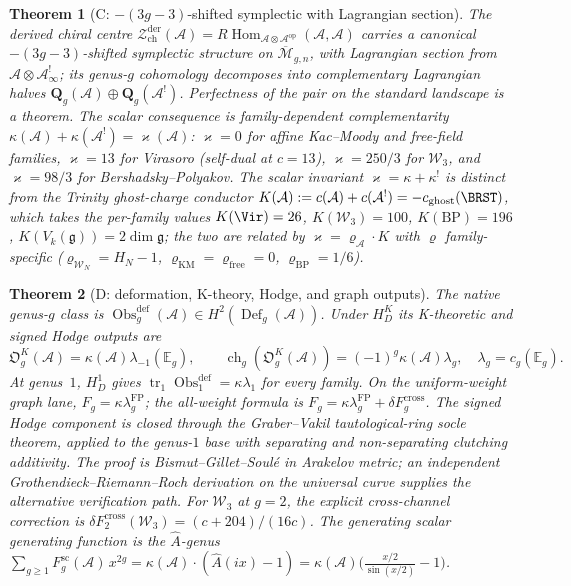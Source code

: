 \documentclass[11pt]{article}
\providecommand{\cA}{\mathcal{A}}
\providecommand{\cM}{\mathcal{M}}
\providecommand{\cW}{\mathcal{W}}
\providecommand{\cZ}{\mathcal{Z}}
\providecommand{\bE}{\mathbb{E}}
\providecommand{\fg}{\mathfrak{g}}
\newtheorem{theorem}{Theorem}[section]
\begin{document}
\begin{theorem}[C: $-(3g{-}3)$-shifted symplectic with Lagrangian section]
The derived chiral centre
$\cZ^{\mathrm{der}}_{\mathrm{ch}}(\cA) =
R\!\operatorname{Hom}_{\cA\otimes\cA^{\mathrm{op}}}(\cA,\cA)$
carries a canonical $-(3g{-}3)$-shifted symplectic structure on
$\overline{\cM}_{g,n}$, with Lagrangian section from
$\cA\otimes\cA^{!}_\infty$; its genus-$g$ cohomology decomposes
into complementary Lagrangian halves
$\mathbf{Q}_g(\cA)\oplus\mathbf{Q}_g(\cA^{!})$. Perfectness of the
pair on the standard landscape is a theorem. The scalar consequence
is family-dependent complementarity $\kappa(\cA)+\kappa(\cA^{!})=\varkappa(\cA)$:
$\varkappa=0$ for affine Kac--Moody and free-field families, $\varkappa=13$ for
Virasoro (self-dual at $c=13$), $\varkappa=250/3$ for $\cW_3$, and
$\varkappa=98/3$ for Bershadsky--Polyakov. The scalar invariant
$\varkappa=\kappa+\kappa^{!}$ is distinct from the Trinity ghost-charge
conductor $K(\cA):=c(\cA)+c(\cA^{!})=-c_{\mathrm{ghost}}(\BRST)$, which takes
the per-family values $K(\Vir)=26$, $K(\cW_3)=100$, $K(\mathrm{BP})=196$,
$K(V_k(\fg))=2\dim\fg$; the two are related by
$\varkappa=\varrho_{\cA}\cdot K$ with $\varrho$ family-specific
($\varrho_{\cW_N}=H_N-1$, $\varrho_{\mathrm{KM}}=\varrho_{\mathrm{free}}=0$,
$\varrho_{\mathrm{BP}}=1/6$).
\end{theorem}

\begin{theorem}[D: deformation, K-theory, Hodge, and graph outputs]
The native genus-$g$ class is
$\operatorname{Obs}^{\mathrm{def}}_g(\cA)
\in H^2(\operatorname{Def}_g(\cA))$.
Under $H_D^K$ its K-theoretic and signed Hodge outputs are
\[
 \mathfrak{O}_g^K(\cA)=\kappa(\cA)\lambda_{-1}(\bE_g),
 \qquad
 \operatorname{ch}_g(\mathfrak{O}_g^K(\cA))
 =(-1)^g\kappa(\cA)\lambda_g,
 \quad \lambda_g=c_g(\bE_g).
\]
At genus~$1$, $H_D^1$ gives
$\operatorname{tr}_1\operatorname{Obs}^{\mathrm{def}}_1
=\kappa\lambda_1$ for every family.  On the uniform-weight graph
lane, $F_g=\kappa\lambda_g^{\mathrm{FP}}$; the all-weight formula is
$F_g=\kappa\lambda_g^{\mathrm{FP}}+\delta F_g^{\mathrm{cross}}$.
The signed Hodge component is closed through the
Graber--Vakil tautological-ring socle theorem, applied to the
genus-$1$ base with separating and non-separating clutching
additivity. The proof is Bismut--Gillet--Soul\'e in
Arakelov metric; an independent Grothendieck--Riemann--Roch
derivation on the universal curve supplies the alternative
verification path. For $\cW_3$ at $g=2$, the explicit
cross-channel correction is
$\delta F_2^{\mathrm{cross}}(\cW_3) = (c+204)/(16c)$. The generating
scalar generating function is the $\hat A$-genus
$\sum_{g\ge 1}F_g^{\mathrm{sc}}(\cA)\,x^{2g}
= \kappa(\cA)\cdot(\hat A(ix)-1)
= \kappa(\cA)\bigl(\tfrac{x/2}{\sin(x/2)}-1\bigr)$.
\end{theorem}
\end{document}
